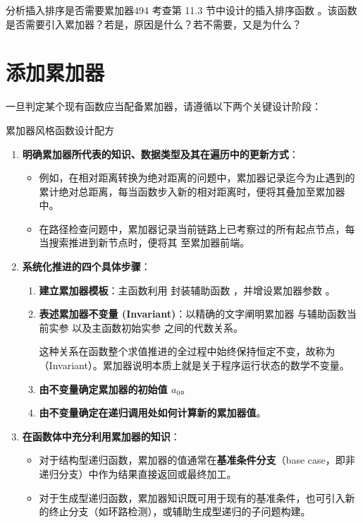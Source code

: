 \begin{exercise}{分析插入排序是否需要累加器}{494}
考查第 11.3 节中设计的插入排序函数 。该函数是否需要引入累加器？若是，原因是什么？若不需要，又是为什么？
\end{exercise}

\section{添加累加器}
\label{sec:ch32_2}

一旦判定某个现有函数应当配备累加器，请遵循以下两个关键设计阶段：

\begin{recipebox}{累加器风格函数设计配方}
\begin{enumerate}
  \item \textbf{明确累加器所代表的知识、数据类型及其在遍历中的更新方式}：
  \begin{itemize}
    \item 例如，在相对距离转换为绝对距离的问题中，累加器记录迄今为止遇到的累计绝对总距离，每当函数步入新的相对距离时，便将其叠加至累加器中。
    \item 在路径检查问题中，累加器记录当前链路上已考察过的所有起点节点，每当搜索推进到新节点时，便将其  至累加器前端。
  \end{itemize}
  \item \textbf{系统化推进的四个具体步骤}：
  \begin{enumerate}
    \item \textbf{建立累加器模板}：主函数利用  封装辅助函数 ，并增设累加器参数 。
    \item \textbf{表述累加器不变量 (Invariant)}：以精确的文字阐明累加器  与辅助函数当前实参  以及主函数初始实参  之间的代数关系。
    \begin{notebox}
    这种关系在函数整个求值推进的全过程中始终保持恒定不变，故称为（Invariant）。累加器说明本质上就是关于程序运行状态的数学不变量。
    \end{notebox}
    \item \textbf{由不变量确定累加器的初始值 $a_0$}。
    \item \textbf{由不变量确定在递归调用处如何计算新的累加器值}。
  \end{enumerate}
  \item \textbf{在函数体中充分利用累加器的知识}：
  \begin{itemize}
    \item 对于结构型递归函数，累加器的值通常在\textbf{基准条件分支}（base case，即非递归分支）中作为结果直接返回或最终加工。
    \item 对于生成型递归函数，累加器知识既可用于现有的基准条件，也可引入新的终止分支（如环路检测），或辅助生成型递归的子问题构建。
  \end{itemize}
\end{enumerate}
\end{recipebox}

